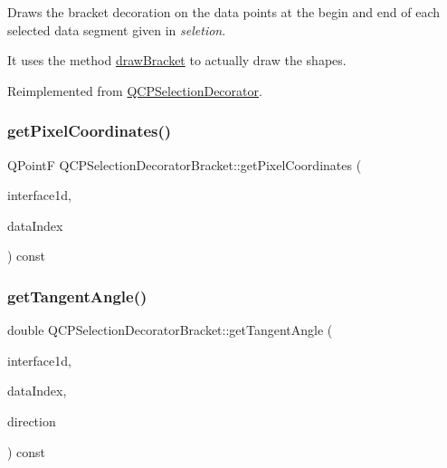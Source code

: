 Draws the bracket decoration on the data points at the begin and end of each selected data segment given in {\itshape seletion}.

It uses the method \hyperlink{class_q_c_p_selection_decorator_bracket_a57b65b5508d5bd0f27c9318f3d4646be}{draw\+Bracket} to actually draw the shapes.

Reimplemented from \hyperlink{class_q_c_p_selection_decorator_a4f8eb49e277063845391e803ae23054a}{Q\+C\+P\+Selection\+Decorator}.

\mbox{\label{class_q_c_p_selection_decorator_bracket_a9925ed667e8a645fcb9949bd02ee4a19}} 
\subsubsection{\texorpdfstring{get\+Pixel\+Coordinates()}{getPixelCoordinates()}}
{\footnotesize\ttfamily Q\+PointF Q\+C\+P\+Selection\+Decorator\+Bracket\+::get\+Pixel\+Coordinates (\begin{DoxyParamCaption}\item[{const \hyperlink{class_q_c_p_plottable_interface1_d}{Q\+C\+P\+Plottable\+Interface1D} $\ast$}]{interface1d,  }\item[{int}]{data\+Index }\end{DoxyParamCaption}) const\hspace{0.3cm}{\ttfamily [protected]}}

\mbox{\label{class_q_c_p_selection_decorator_bracket_ac002e20586950bf5c91a399863769c61}} 
\subsubsection{\texorpdfstring{get\+Tangent\+Angle()}{getTangentAngle()}}
{\footnotesize\ttfamily double Q\+C\+P\+Selection\+Decorator\+Bracket\+::get\+Tangent\+Angle (\begin{DoxyParamCaption}\item[{const \hyperlink{class_q_c_p_plottable_interface1_d}{Q\+C\+P\+Plottable\+Interface1D} $\ast$}]{interface1d,  }\item[{int}]{data\+Index,  }\item[{int}]{direction }\end{DoxyParamCaption}) const\hspace{0.3cm}{\ttfamily [protected]}}

